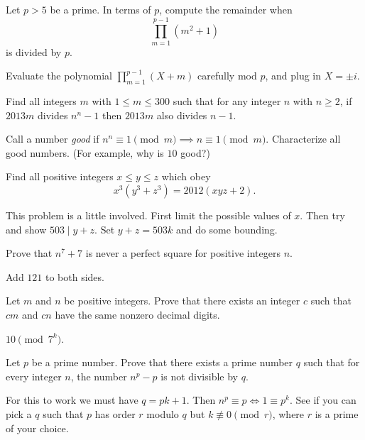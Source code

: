 \documentclass[11pt]{scrartcl}
\begin{document}
\begin{problem}
  Let $p > 5$ be a prime.
  In terms of $p$, compute the remainder when
  \[ \prod_{m=1}^{p-1} \left( m^2+1 \right) \]
  is divided by $p$.
  \begin{hint}
    Evaluate the polynomial $\prod_{m=1}^{p-1} (X+m)$ carefully mod $p$, and plug in $X = \pm i$.
  \end{hint}
\end{problem}

\begin{problem}
  \label{prob:omo}
  Find all integers $m$ with $1 \le m \le 300$ such that
  for any integer $n$ with $n \ge 2$,
  if $2013m$ divides $n^n-1$ then $2013m$ also divides $n-1$.
  \begin{hint}
    Call a number \emph{good} if $n^n \equiv 1 \pmod m \implies n \equiv 1 \pmod m$.
    Characterize all good numbers.
    (For example, why is $10$ good?)
  \end{hint}
\end{problem}

\begin{problem}
  [Shortlist 2012 N2]
  Find all positive integers $x \le y \le z$ which obey
  \[ x^3(y^3+z^3) = 2012(xyz+2). \]
  \begin{hint}
    This problem is a little involved.
    First limit the possible values of $x$.
    Then try and show $503 \mid y+z$.
    Set $y+z=503k$ and do some bounding.
  \end{hint}
\end{problem}

\begin{problem}
  \label{prob:tst}
  Prove that $n^7+7$ is never a perfect square for positive integers $n$.
  \begin{hint}
    Add $121$ to both sides.
  \end{hint}
\end{problem}

\begin{problem}
  [USAMO 2013/5] Let $m$ and $n$ be positive integers.
  Prove that there exists an integer $c$ such that $cm$ and $cn$ have the same nonzero decimal digits.
  \begin{hint}
    $10 \pmod{7^k}$.
  \end{hint}
\end{problem}

\begin{problem}
  [IMO 2003/6]
  \label{prob:imo}
  Let $p$ be a prime number.
  Prove that there exists a prime number $q$ such that for every integer $n$,
  the number $n^p-p$ is not divisible by $q$.
  \begin{hint}
    For this to work we must have $q=pk+1$. Then $n^p \equiv p \iff 1 \equiv p^k$.
    See if you can pick a $q$ such that $p$ has order $r$ modulo $q$
    but $k \not\equiv 0 \pmod{r}$, where $r$ is a prime of your choice.
  \end{hint}
\end{problem}
\end{document}
